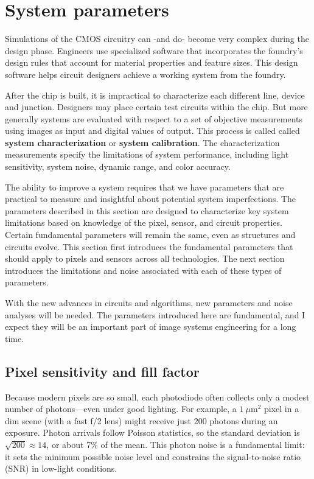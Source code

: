 \documentclass[
  letterpaper,
]{book}
\begin{document}
\chapter{System parameters}\label{sec-system-parameters}

Simulations of the CMOS circuitry can -and do- become very complex
during the design phase. Engineers use specialized software that
incorporates the foundry's design rules that account for material
properties and feature sizes. This design software helps circuit
designers achieve a working system from the foundry.

After the chip is built, it is impractical to characterize each
different line, device and junction. Designers may place certain test
circuits within the chip. But more generally systems are evaluated with
respect to a set of objective measurements using images as input and
digital values of output. This process is called called \textbf{system
characterization} or \textbf{system calibration}. The characterization
measurements specify the limitations of system performance, including
light sensitivity, system noise, dynamic range, and color accuracy.

The ability to improve a system requires that we have parameters that
are practical to measure and insightful about potential system
imperfections. The parameters described in this section are designed to
characterize key system limitations based on knowledge of the pixel,
sensor, and circuit properties. Certain fundamental parameters will
remain the same, even as structures and circuits evolve. This section
first introduces the fundamental parameters that should apply to pixels
and sensors across all technologies. The next section introduces the
limitations and noise associated with each of these types of parameters.

With the new advances in circuits and algorithms, new parameters and
noise analyses will be needed. The parameters introduced here are
fundamental, and I expect they will be an important part of image
systems engineering for a long time.

\section{Pixel sensitivity and fill
factor}\label{sec-pixel-sensitivity-fillfactor}

Because modern pixels are so small, each photodiode often collects only
a modest number of photons---even under good lighting. For example, a
\(1~\mu\text{m}^2\) pixel in a dim scene (with a fast f/2 lens) might
receive just 200 photons during an exposure. Photon arrivals follow
Poisson statistics, so the standard deviation is
\(\sqrt{200} \approx 14\), or about 7\% of the mean. This photon noise
is a fundamental limit: it sets the minimum possible noise level and
constrains the signal-to-noise ratio (SNR) in low-light conditions.
\end{document}
